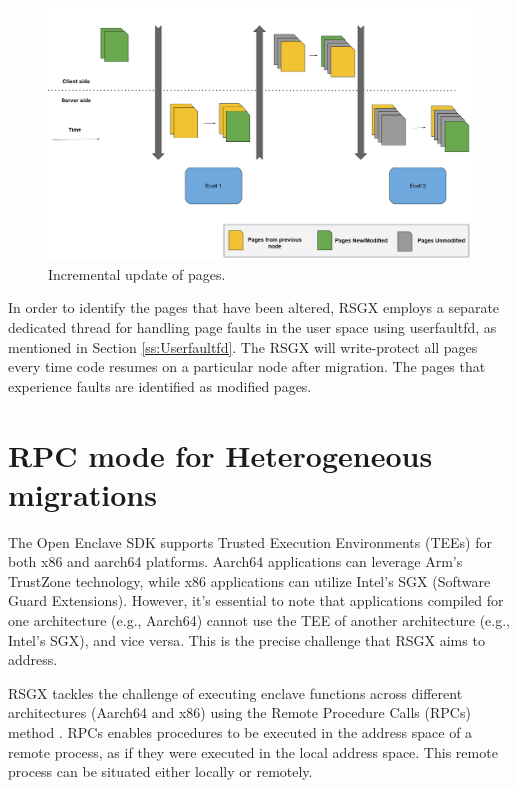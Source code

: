 \documentclass[article, doublespace,nopageskip]{VTthesis} %
\newcommand{\monitor}{RSGX \xspace}
\begin{document}
    \begin{figure}[htb]
	    \centering
		\includegraphics[scale=0.7]{figures/incremental_pages.png}
		\caption{Incremental update of pages.} 
		\label{fig:pages_incremental}
	\end{figure}


    In order to identify the pages that have been altered, \monitor employs a separate dedicated thread for handling page faults in the user space using userfaultfd, as mentioned in Section \ref{ss:Userfaultfd}. The \monitor will write-protect all pages every time code resumes on a particular node after migration. The pages that experience faults are identified as modified pages.

    \section{RPC mode for Heterogeneous migrations} \label{ase: RPC mode}
    The Open Enclave SDK supports Trusted Execution Environments (TEEs) for both x86 and aarch64 platforms. Aarch64 applications can leverage Arm's TrustZone technology, while x86 applications can utilize Intel's SGX (Software Guard Extensions). However, it's essential to note that applications compiled for one architecture (e.g., Aarch64) cannot use the TEE of another architecture (e.g., Intel's SGX), and vice versa. This is the precise challenge that \monitor aims to address. 

    \monitor tackles the challenge of executing enclave functions across different architectures (Aarch64 and x86) using the Remote Procedure Calls (RPCs) method \cite{Remote-procedure-call}. RPCs enables procedures to be executed in the address space of a remote process, as if they were executed in the local address space. This remote process can be situated either locally or remotely.
\end{document}
